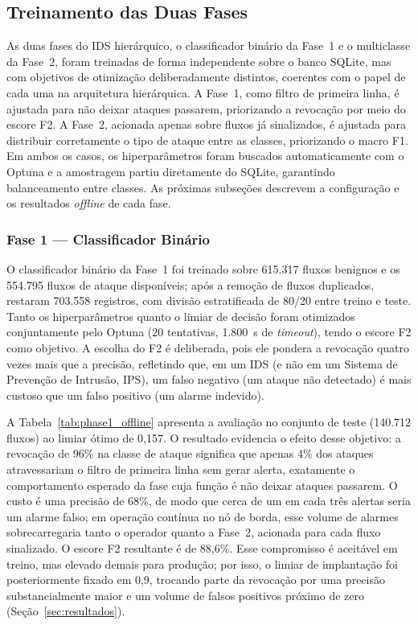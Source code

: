 \documentclass[12pt]{article}
\begin{document}
\subsection{Treinamento das Duas Fases}
\label{subsec:treinamento}

As duas fases do IDS hierárquico, o classificador binário da Fase~1 e o
multiclasse da Fase~2, foram treinadas de forma independente sobre o banco
SQLite, mas com objetivos de otimização deliberadamente distintos, coerentes com
o papel de cada uma na arquitetura hierárquica. A Fase~1, como filtro de primeira linha, é
ajustada para não deixar ataques passarem, priorizando a revocação por meio do
escore F2. A Fase~2, acionada apenas sobre fluxos já sinalizados, é ajustada para
distribuir corretamente o tipo de ataque entre as classes, priorizando o macro
F1. Em ambos os casos, os hiperparâmetros foram buscados automaticamente com o
Optuna e a amostragem partiu diretamente do SQLite, garantindo balanceamento
entre classes. As próximas subseções descrevem a configuração e os resultados
\textit{offline} de cada fase.

\subsubsection{Fase 1 — Classificador Binário}

O classificador binário da Fase~1 foi treinado sobre 615.317 fluxos
benignos e os 554.795 fluxos de ataque disponíveis; após a remoção de fluxos
duplicados, restaram 703.558 registros, com divisão estratificada de 80/20 entre
treino e teste. Tanto os
hiperparâmetros quanto o limiar de decisão foram otimizados conjuntamente pelo
Optuna (20 tentativas, 1.800~s de \textit{timeout}), tendo o escore F2 como
objetivo. A escolha do F2 é deliberada, pois ele pondera a revocação quatro vezes
mais que a precisão, refletindo que, em um IDS (e não em um Sistema de Prevenção
de Intrusão, IPS), um falso negativo (um ataque não detectado) é mais custoso que
um falso positivo (um alarme indevido).

A Tabela~\ref{tab:phase1_offline} apresenta a avaliação no conjunto de teste
(140.712 fluxos) ao limiar ótimo de 0,157. O resultado evidencia o efeito desse
objetivo: a revocação de 96\% na classe de ataque significa que apenas 4\% dos
ataques atravessariam o filtro de primeira linha sem gerar alerta, exatamente o
comportamento esperado da fase cuja função é não deixar ataques passarem. O
custo é uma precisão de 68\%, de modo que cerca de um em cada três alertas seria
um alarme falso; em operação contínua no nó de borda, esse volume de alarmes
sobrecarregaria tanto o operador quanto a Fase~2, acionada para cada fluxo
sinalizado. O escore F2 resultante é de 88,6\%. Esse compromisso é aceitável em
treino, mas elevado demais para produção; por isso, o limiar de implantação foi
posteriormente fixado em 0,9, trocando parte da revocação por uma precisão
substancialmente maior e um volume de falsos positivos próximo de zero
(Seção~\ref{sec:resultados}).
\end{document}
